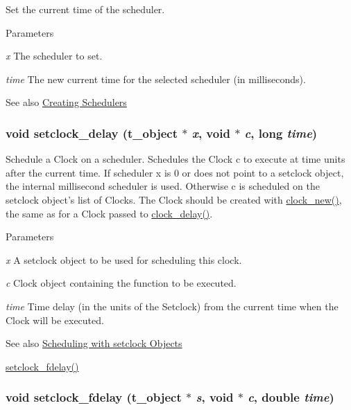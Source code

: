 Set the current time of the scheduler. 
\begin{DoxyParams}{Parameters}
\item[{\em x}]The scheduler to set. \item[{\em time}]The new current time for the selected scheduler (in milliseconds). \end{DoxyParams}
\begin{DoxySeeAlso}{See also}
\hyperlink{group__clocks_creating_schedulers}{Creating Schedulers} 
\end{DoxySeeAlso}
\hypertarget{group__clocks_gadf4bd364fd019bed91a587337eb4801e}{
\subsubsection[{setclock\_\-delay}]{\setlength{\rightskip}{0pt plus 5cm}void setclock\_\-delay ({\bf t\_\-object} $\ast$ {\em x}, \/  void $\ast$ {\em c}, \/  long {\em time})}}
\label{group__clocks_gadf4bd364fd019bed91a587337eb4801e}


Schedule a Clock on a scheduler. Schedules the Clock c to execute at time units after the current time. If scheduler x is 0 or does not point to a setclock object, the internal millisecond scheduler is used. Otherwise c is scheduled on the setclock object’s list of Clocks. The Clock should be created with \hyperlink{group__clocks_ga6257ddd41904756699208f135f6539fd}{clock\_\-new()}, the same as for a Clock passed to \hyperlink{group__clocks_ga9ac56d198904627333de740743086920}{clock\_\-delay()}.


\begin{DoxyParams}{Parameters}
\item[{\em x}]A setclock object to be used for scheduling this clock. \item[{\em c}]Clock object containing the function to be executed. \item[{\em time}]Time delay (in the units of the Setclock) from the current time when the Clock will be executed. \end{DoxyParams}
\begin{DoxySeeAlso}{See also}
\hyperlink{group__clocks_setclock}{Scheduling with setclock Objects} 

\hyperlink{group__clocks_ga91badd52e8729b007c22461368a21854}{setclock\_\-fdelay()} 
\end{DoxySeeAlso}
\hypertarget{group__clocks_ga91badd52e8729b007c22461368a21854}{
\subsubsection[{setclock\_\-fdelay}]{\setlength{\rightskip}{0pt plus 5cm}void setclock\_\-fdelay ({\bf t\_\-object} $\ast$ {\em s}, \/  void $\ast$ {\em c}, \/  double {\em time})}}
\label{group__clocks_ga91badd52e8729b007c22461368a21854}


